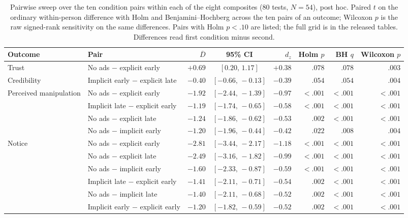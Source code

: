 \begin{table}[H]
\centering
\small
\caption{Pairwise sweep over the ten condition pairs within each of the eight composites (\(80\) tests, \(N=54\)), post hoc. Paired \(t\) on the ordinary within-person difference with Holm and Benjamini--Hochberg across the ten pairs of an outcome; Wilcoxon \(p\) is the raw signed-rank sensitivity on the same differences. Pairs with Holm \(p<.10\) are listed; the full grid is in the released tables. Differences read first condition minus second.}
\label{tab:beh-pairwise}
\setlength{\tabcolsep}{4pt}
\begin{tabular}{@{}ll r c r r r r@{}}
\toprule
Outcome & Pair & \(\overline{D}\) & 95\% CI & \(d_z\) & Holm \(p\) & BH \(q\) & Wilcoxon \(p\) \\
\midrule
Trust & No ads \(-\) explicit early & $+0.69$ & $[0.20,\,1.17]$ & $+0.38$ & $.078$ & $.078$ & $.003$ \\
\addlinespace[2pt]
Credibility & Implicit early \(-\) explicit late & $-0.40$ & $[-0.66,\,-0.13]$ & $-0.39$ & $.054$ & $.054$ & $.004$ \\
\addlinespace[2pt]
Perceived manipulation & No ads \(-\) explicit early & $-1.92$ & $[-2.44,\,-1.39]$ & $-0.97$ & $<.001$ & $<.001$ & $<.001$ \\
 & Implicit late \(-\) explicit early & $-1.19$ & $[-1.74,\,-0.65]$ & $-0.58$ & $<.001$ & $<.001$ & $<.001$ \\
 & No ads \(-\) explicit late & $-1.24$ & $[-1.86,\,-0.62]$ & $-0.53$ & $.002$ & $<.001$ & $<.001$ \\
 & No ads \(-\) implicit early & $-1.20$ & $[-1.96,\,-0.44]$ & $-0.42$ & $.022$ & $.008$ & $.004$ \\
\addlinespace[2pt]
Notice & No ads \(-\) explicit early & $-2.81$ & $[-3.44,\,-2.17]$ & $-1.18$ & $<.001$ & $<.001$ & $<.001$ \\
 & No ads \(-\) explicit late & $-2.49$ & $[-3.16,\,-1.82]$ & $-0.99$ & $<.001$ & $<.001$ & $<.001$ \\
 & No ads \(-\) implicit early & $-1.60$ & $[-2.33,\,-0.87]$ & $-0.59$ & $<.001$ & $<.001$ & $<.001$ \\
 & Implicit late \(-\) explicit early & $-1.41$ & $[-2.11,\,-0.71]$ & $-0.54$ & $.002$ & $<.001$ & $<.001$ \\
 & No ads \(-\) implicit late & $-1.40$ & $[-2.11,\,-0.68]$ & $-0.52$ & $.002$ & $<.001$ & $<.001$ \\
 & Implicit early \(-\) explicit early & $-1.20$ & $[-1.82,\,-0.59]$ & $-0.52$ & $.002$ & $<.001$ & $<.001$ \\

\end{tabular}
\end{table}

